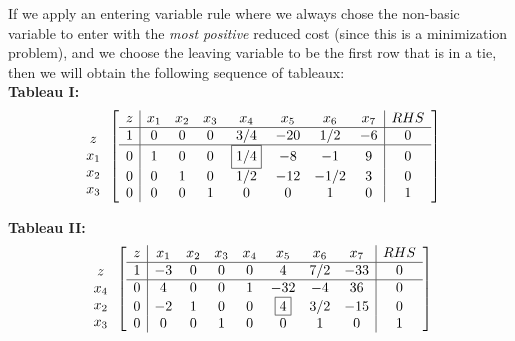 \begin{example}
If we apply an entering variable rule where we always chose the non-basic variable to enter with the \textit{most positive} reduced cost (since this is a minimization problem), and we choose the leaving variable to be the first row that is in a tie, then we will obtain the following sequence of tableaux:\\
\noindent\textbf{Tableau I:}
\begin{displaymath}
\begin{array}{c}
\\z\\x_1\\x_2\\x_3
\end{array}\left[
\begin{array}{c|ccccccc|c}
z & x_1 & x_2 & x_3 & x_4 & x_5 & x_6 & x_7 & RHS\\
\hline
1 & 0 & 0 & 0 & 3/4 & -20 & 1/2  & -6 & 0\\
\hline
0 & 1 & 0 & 0 & \fbox{1/4} & -8  & -1   & 9  & 0\\
0 & 0 & 1 & 0 & 1/2 & -12 & -1/2 & 3  & 0\\
0 & 0 & 0 & 1 & 0   &  0  & 1    & 0  & 1
\end{array}\right]
\end{displaymath}

\noindent\textbf{Tableau II:}
\begin{displaymath}
\begin{array}{c}
\\z\\x_4\\x_2\\x_3
\end{array}\left[
\begin{array}{c|ccccccc|c}
z & x_1 & x_2 & x_3 & x_4 & x_5 & x_6 & x_7 & RHS\\
\hline
1 & -3 & 0 & 0 & 0 & 4 & 7/2  & -33 & 0\\
\hline
0 & 4  & 0 & 0 & 1   & -32  & -4   & 36   & 0\\
0 & -2 & 1 & 0 & 0   &   \fbox{4}  & 3/2  & -15  & 0\\
0 & 0  & 0 & 1 & 0   &  0   & 1    & 0    & 1
\end{array}\right]
\end{displaymath}


\end{example}
